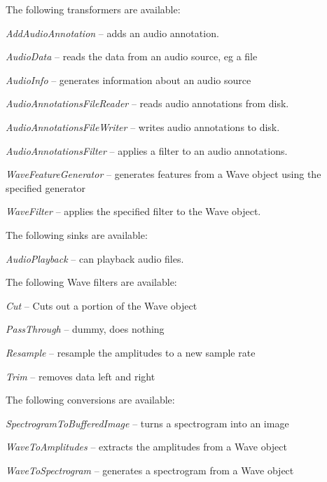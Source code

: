 \documentclass[a4paper]{book}
\begin{document}
\noindent The following transformers are available:
\begin{tight_itemize}
  \item \textit{AddAudioAnnotation} -- adds an audio annotation.
  \item \textit{AudioData} -- reads the data from an audio source, eg a file
  \item \textit{AudioInfo} -- generates information about an audio source
  \item \textit{AudioAnnotationsFileReader} -- reads audio annotations from disk.
  \item \textit{AudioAnnotationsFileWriter} -- writes audio annotations to disk.
  \item \textit{AudioAnnotationsFilter} -- applies a filter to an audio annotations.
  \item \textit{WaveFeatureGenerator} -- generates features from a Wave object
  using the specified generator
  \item \textit{WaveFilter} -- applies the specified filter to the Wave object.
\end{tight_itemize}

\noindent The following sinks are available:
\begin{tight_itemize}
  \item \textit{AudioPlayback} -- can playback audio files.
\end{tight_itemize}

\noindent The following Wave filters are available:
\begin{tight_itemize}
  \item \textit{Cut} -- Cuts out a portion of the Wave object
  \item \textit{PassThrough} -- dummy, does nothing
  \item \textit{Resample} -- resample the amplitudes to a new sample rate
  \item \textit{Trim} -- removes data left and right
\end{tight_itemize}

\noindent The following conversions are available:
\begin{tight_itemize}
  \item \textit{SpectrogramToBufferedImage} -- turns a spectrogram into an image
  \item \textit{WaveToAmplitudes} -- extracts the amplitudes from a Wave object
  \item \textit{WaveToSpectrogram} -- generates a spectrogram from a Wave object
\end{tight_itemize}
\end{document}

